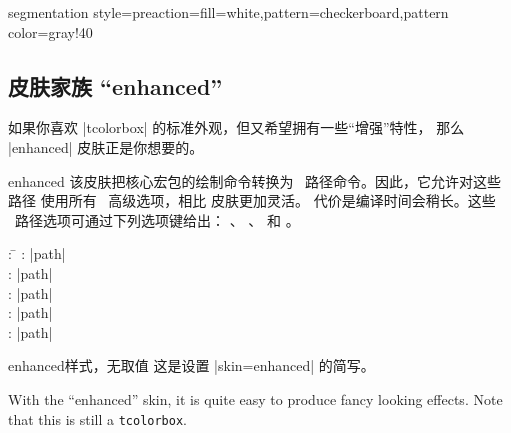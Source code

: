 \begin{dispExample*}{segmentation style={preaction={fill=white},pattern=checkerboard,pattern color=gray!40}}
\end{dispExample*}


\clearpage
\subsection{皮肤家族 \enquote{enhanced}}
\begin{marker}
如果你喜欢 |tcolorbox| 的标准外观，但又希望拥有一些\enquote{增强}特性，
那么 |enhanced| 皮肤正是你想要的。
\end{marker}

\begin{docSkin}{enhanced}
  该皮肤把核心宏包的绘制命令转换为 \tikzname\ 路径命令。因此，它允许对这些路径
  使用所有 \tikzname\ 高级选项，相比  皮肤更加灵活。
  代价是编译时间会稍长。这些 \tikzname\ 路径选项可通过下列选项键给出：
  、
  、
   和
  。
\begin{tcolorbox}[skintable=enhanced]
  \begin{tabbing}
    : \=\kill
    :           \> |path|\\
    : \> |path|\\ 
    :        \> |path|\\
    :    \> |path|\\
    :           \> |path|
  \end{tabbing}
\end{tcolorbox}
\end{docSkin}


\begin{docTcbKey}{enhanced}{}{样式，无取值}
  这是设置 |skin=enhanced| 的简写。
\end{docTcbKey}

\begin{dispExample}
\end{dispExample}

\clearpage

\begin{dispExample}

\begin{tcolorbox}[title=Nice box in rainbow colors]
  With the \enquote{enhanced} skin, it is quite easy to produce fancy looking effects.
  \tcblower
  Note that this is still a \texttt{tcolorbox}.
\end{tcolorbox}
\end{dispExample}


